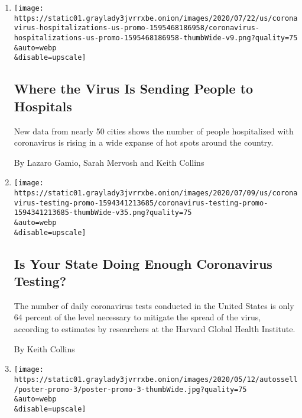 \begin{enumerate}
\def\labelenumi{\arabic{enumi}.}
\item
  \href{/interactive/2020/07/23/us/coronavirus-hospitalizations-us.html}{}

  \texttt{[image: https://static01.graylady3jvrrxbe.onion/images/2020/07/22/us/coronavirus-hospitalizations-us-promo-1595468186958/coronavirus-hospitalizations-us-promo-1595468186958-thumbWide-v9.png?quality=75\\\&auto=webp\\\&disable=upscale]}

  \hypertarget{where-the-virus-is-sending-people-to-hospitals}{%
  \subsection{Where the Virus Is Sending People to
  Hospitals}\label{where-the-virus-is-sending-people-to-hospitals}}

  New data from nearly 50 cities shows the number of people hospitalized
  with coronavirus is rising in a wide expanse of hot spots around the
  country.

  By Lazaro Gamio, Sarah Mervosh and Keith Collins
\item
  \href{/interactive/2020/us/coronavirus-testing.html}{}

  \texttt{[image: https://static01.graylady3jvrrxbe.onion/images/2020/07/09/us/coronavirus-testing-promo-1594341213685/coronavirus-testing-promo-1594341213685-thumbWide-v35.png?quality=75\\\&auto=webp\\\&disable=upscale]}

  \hypertarget{is-your-state-doing-enough-coronavirus-testing}{%
  \subsection{Is Your State Doing Enough Coronavirus
  Testing?}\label{is-your-state-doing-enough-coronavirus-testing}}

  The number of daily coronavirus tests conducted in the United States
  is only 64 percent of the level necessary to mitigate the spread of
  the virus, according to estimates by researchers at the Harvard Global
  Health Institute.

  By Keith Collins
\item
  \href{/interactive/2020/05/12/us/coronavirus-testing-white-house.html}{}

  \texttt{[image: https://static01.graylady3jvrrxbe.onion/images/2020/05/12/autossell/poster-promo-3/poster-promo-3-thumbWide.jpg?quality=75\\\&auto=webp\\\&disable=upscale]}


\end{enumerate}
